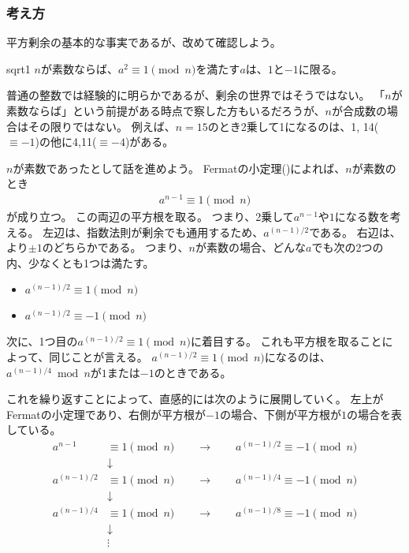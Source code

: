 \subsubsection{考え方}
平方剰余の基本的な事実であるが、改めて確認しよう。

\begin{Prop}{}{sqrt1}
$n$が素数ならば、$a^2 \equiv 1 \pmod{n}$を満たす$a$は、$1$と$-1$に限る。
\end{Prop}

普通の整数では経験的に明らかであるが、剰余の世界ではそうではない。
「$n$が素数ならば」という前提がある時点で察した方もいるだろうが、$n$が合成数の場合はその限りではない。
例えば、$n=15$のとき2乗して1になるのは、1, 14($\equiv-1$)の他に4,11($\equiv-4$)がある。

$n$が素数であったとして話を進めよう。
Fermatの小定理()によれば、$n$が素数のとき
\begin{align*}
a^{n-1} \equiv 1 \pmod{n}
\end{align*}
が成り立つ。
この両辺の平方根を取る。
つまり、2乗して$a^{n-1}$や$1$になる数を考える。
左辺は、指数法則が剰余でも通用するため、$a^{(n-1)/2}$である。
右辺は、より$\pm1$のどちらかである。
つまり、$n$が素数の場合、どんな$a$でも次の2つの内、少なくとも1つは満たす。
\begin{itemize}
 \item $a^{(n-1)/2} \equiv 1 \pmod{n}$
 \item $a^{(n-1)/2} \equiv -1 \pmod{n}$
\end{itemize}

次に、1つ目の$a^{(n-1)/2} \equiv 1 \pmod{n}$に着目する。
これも平方根を取ることによって、同じことが言える。
$a^{(n-1)/2} \equiv 1 \pmod{n}$になるのは、$a^{(n-1)/4}\bmod{n}$が$1$または$-1$のときである。

これを繰り返すことによって、直感的には次のように展開していく。
左上がFermatの小定理であり、右側が平方根が$-1$の場合、下側が平方根が$1$の場合を表している。
\begin{align*}
a^{n-1} &\equiv 1 \pmod{n} \qquad\to\qquad a^{(n-1)/2} \equiv -1 \pmod{n}\\
&\downarrow \\
a^{(n-1)/2} &\equiv 1 \pmod{n} \qquad\to\qquad a^{(n-1)/4} \equiv -1 \pmod{n} \\
&\downarrow \\
a^{(n-1)/4} &\equiv 1 \pmod{n} \qquad\to\qquad a^{(n-1)/8} \equiv -1 \pmod{n} \\
&\downarrow \\
&\vdots
\end{align*}

